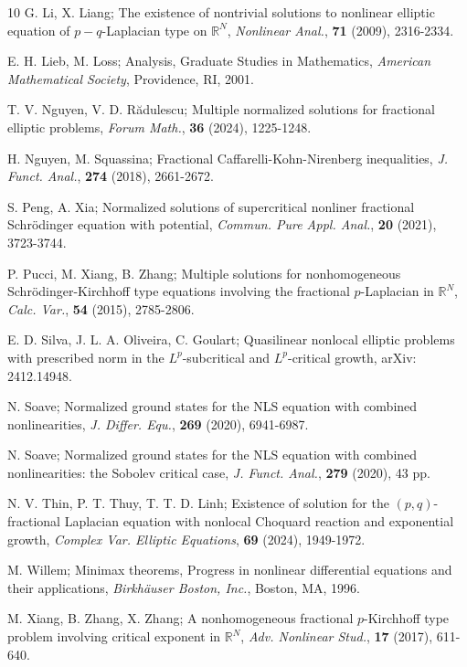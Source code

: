 \documentclass[reqno]{amsart}
\begin{document}
\begin{thebibliography}{10}
G. Li, X. Liang;
The existence of nontrivial solutions to nonlinear elliptic equation of 
$p-q$-Laplacian type on $\mathbb{R}^N$,
\emph{Nonlinear Anal.}, \textbf{71} (2009), 2316-2334.

E. H. Lieb, M. Loss;
Analysis, Graduate Studies in Mathematics,
\emph{American Mathematical Society}, Providence, RI, 2001.

T. V. Nguyen, V. D. R\u{a}dulescu;
Multiple normalized solutions for fractional
elliptic problems,
\emph{Forum Math.}, \textbf{36} (2024), 1225-1248.

H. Nguyen,  M. Squassina;
Fractional Caffarelli-Kohn-Nirenberg inequalities,
\emph{J. Funct. Anal.}, \textbf{274} (2018), 2661-2672.

S. Peng, A. Xia;
Normalized solutions of supercritical nonliner fractional
Schr\"{o}dinger equation with potential,
\emph{Commun. Pure Appl. Anal.}, \textbf{20} (2021), 3723-3744.

P. Pucci, M. Xiang, B. Zhang;
Multiple solutions for nonhomogeneous
Schr\"{o}dinger-Kirchhoff type equations involving
the fractional $p$-Laplacian in $\mathbb{R}^N$,
\emph{Calc. Var.}, \textbf{54} (2015), 2785-2806.

E. D. Silva, J. L. A. Oliveira, C. Goulart;
Quasilinear nonlocal elliptic problems with prescribed norm in the $ L^{p}$-subcritical 
and $ L^{p}$-critical growth, {arXiv: 2412.14948}.

N. Soave;
Normalized ground states for the NLS equation with combined nonlinearities,
\emph{J. Differ. Equ.}, \textbf{269} (2020), 6941-6987.

N. Soave;
Normalized ground states for the NLS equation with combined nonlinearities: 
the Sobolev critical case,
\emph{J. Funct. Anal.}, \textbf{279} (2020), 43 pp.

N. V. Thin, P. T. Thuy, T. T. D. Linh;
Existence of solution for the $(p,q)$-fractional
Laplacian equation with nonlocal Choquard
reaction and exponential growth,
\emph{Complex Var. Elliptic Equations}, \textbf{69} (2024), 1949-1972.

M. Willem;
Minimax theorems, Progress in nonlinear differential equations and their applications,
\emph{Birkh\"{a}user Boston, Inc.}, Boston, MA, 1996.

M. Xiang, B. Zhang, X. Zhang;
A nonhomogeneous fractional $p$-Kirchhoff
type problem involving critical exponent
in $\mathbb{R}^N$,
\emph{Adv. Nonlinear Stud.}, \textbf{17} (2017), 611-640.


\end{thebibliography}
\end{document}
